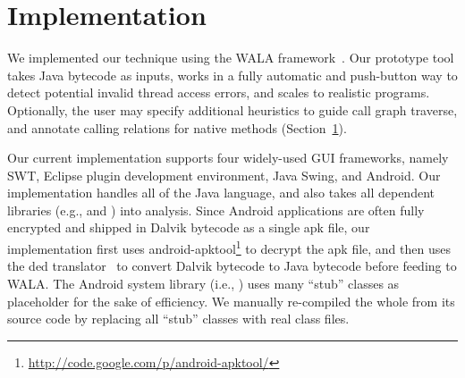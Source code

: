 \section{Implementation}

We implemented our technique using the WALA framework~\cite{walatutorial}.
Our prototype tool takes Java bytecode as inputs, works in a fully
automatic and push-button way to detect potential invalid thread access
errors, and scales to realistic programs.  
Optionally, the user may specify additional heuristics to guide call graph
traverse, and annotate calling relations for native methods (Section~\ref{}).

Our current implementation supports four widely-used GUI frameworks, namely
SWT, Eclipse plugin development environment, Java Swing, and Android.
Our implementation handles all of the Java language, and also takes
all dependent libraries (e.g.,  and )
into analysis. Since Android applications are often fully encrypted and shipped in Dalvik
bytecode as a single apk file, our implementation first uses
android-apktool\footnote{\url{http://code.google.com/p/android-apktool/}} to
decrypt the apk file, and then uses the 
ded translator~\cite{Enck:2011:SAA:2028067.2028088} to convert
Dalvik bytecode to Java bytecode before feeding to WALA.  The Android system
library (i.e., ) uses many ``stub'' classes as
placeholder for the sake of efficiency. We manually re-compiled the whole
 from its source code by replacing all ``stub'' classes
with real class files.
